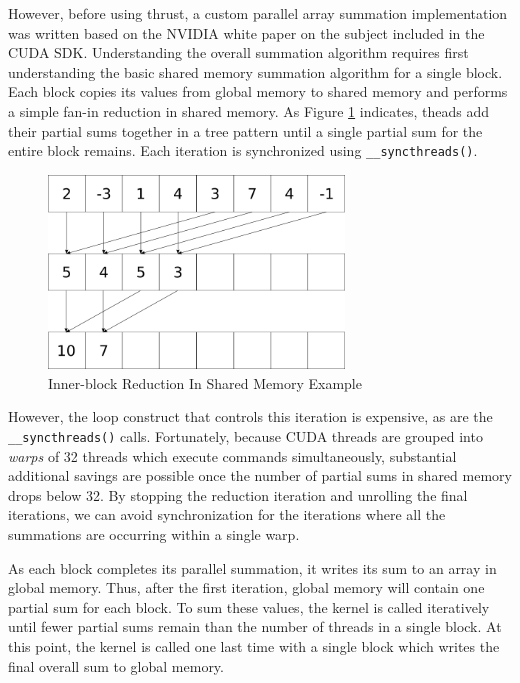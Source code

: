 \documentclass{article}
\begin{document}
However, before using thrust, a custom parallel array summation implementation was written based on the NVIDIA white paper on the subject included in the CUDA SDK.\cite{oprc} Understanding the overall summation algorithm requires first understanding the basic shared memory summation algorithm for a single block. Each block copies its values from global memory to shared memory and performs a simple fan-in reduction in shared memory. As Figure \ref{sum1} indicates, theads add their partial sums together in a tree pattern until a single partial sum for the entire block remains. Each iteration is synchronized using \verb!__syncthreads()!.

\begin{figure}
\centering
\includegraphics[width=0.7\textwidth]{data/summation.png}
\caption{Inner-block Reduction In Shared Memory Example}
\label{sum1}
\end{figure}


However, the loop construct that controls this iteration is expensive, as are the \verb!__syncthreads()! calls. Fortunately, because CUDA threads are grouped into \emph{warps} of 32 threads which execute commands simultaneously, substantial additional savings are possible once the number of partial sums in shared memory drops below 32. By stopping the reduction iteration and unrolling the final iterations, we can avoid synchronization for the iterations where all the summations are occurring within a single warp.

As each block completes its parallel summation, it writes its sum to an array in global memory. Thus, after the first iteration, global memory will contain one partial sum for each block. To sum these values, the kernel is called iteratively until fewer partial sums remain than the number of threads in a single block. At this point, the kernel is called one last time with a single block which writes the final overall sum to global memory.
\end{document}
